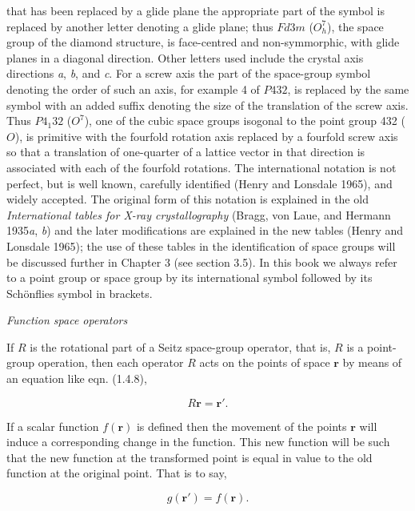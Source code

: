 \documentclass[11pt,a4paper,twoside,openright]{book}
\begin{document}
that has been replaced by a glide plane the appropriate part of the symbol is replaced by another letter denoting a glide plane; thus $Fd3m$ ($O_{h}^{7}$), the space group of the diamond structure, is face-centred and non-symmorphic, with glide planes in a diagonal direction. Other letters used include the crystal axis directions \textit{a}, \textit{b}, and \textit{c}. For a screw axis the part of the space-group symbol denoting the order of such an axis, for example 4 of $P432$, is replaced by the same symbol with an added suffix denoting the size of the translation of the screw axis. Thus $P4_{1}32$ ($O^{7}$), one of the cubic space groups isogonal to the point group 432 ($O$), is primitive with the fourfold rotation axis replaced by a fourfold screw axis so that a translation of one-quarter of a lattice vector in that direction is associated with each of the fourfold rotations. The international notation is not perfect, but is well known, carefully identified (Henry and Lonsdale 1965), and widely accepted. The original form of this notation is explained in the old \textit{International tables for X-ray crystallography} (Bragg, von Laue, and Hermann 1935\textit{a}, \textit{b}) and the later modifications are explained in the new tables (Henry and Lonsdale 1965); the use of these tables in the identification of space groups will be discussed further in Chapter 3 (see section 3.5). In this book we always refer to a point group or space group by its international symbol followed by its Schönflies symbol in brackets.

\textit{Function space operators}

If $R$ is the rotational part of a Seitz space-group operator, that is, $R$ is a point-group operation, then each operator $R$ acts on the points of space $\mathbf{r}$ by means of an equation like eqn. (1.4.8),

\begin{equation*}
R\mathbf{r} = \mathbf{r}'. \tag{1.5.4}
\end{equation*}

If a scalar function $f(\mathbf{r})$ is defined then the movement of the points $\mathbf{r}$ will induce a corresponding change in the function. This new function will be such that the new function at the transformed point is equal in value to the old function at the original point. That is to say,

\begin{equation*}
g(\mathbf{r}') = f(\mathbf{r}). \tag{1.5.5}
\end{equation*}
\end{document}
